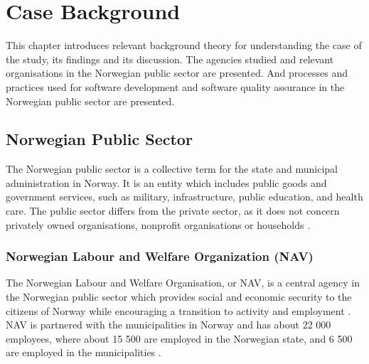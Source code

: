 \chapter{Case Background} \label{sec:case_background}
This chapter introduces relevant background theory for understanding the case of the study, its findings and its discussion. The agencies studied and relevant organisations in the Norwegian public sector are presented. And processes and practices used for software development and software quality assurance in the Norwegian public sector are presented. 

\section{Norwegian Public Sector}
The Norwegian public sector is a collective term for the state and municipal administration in Norway. It is an entity which includes public goods and government services, such as military, infrastructure, public education, and health care. The public sector differs from the private sector, as it does not concern privately owned organisations, nonprofit organisations or households \cite{os_snl_2022}\cite{ps_wiki_2023}.

\subsection{Norwegian Labour and Welfare Organization (NAV)}
The Norwegian Labour and Welfare Organisation, or NAV, is a central agency in the Norwegian public sector which provides social and economic security to the citizens of Norway while encouraging a transition to activity and employment \cite{nav_r_2023}. NAV is partnered with the municipalities in Norway and has about 22 000 employees, where about 15 500 are employed in the Norwegian state, and 6 500 are employed in the municipalities \cite{org_nav_2023}. 



